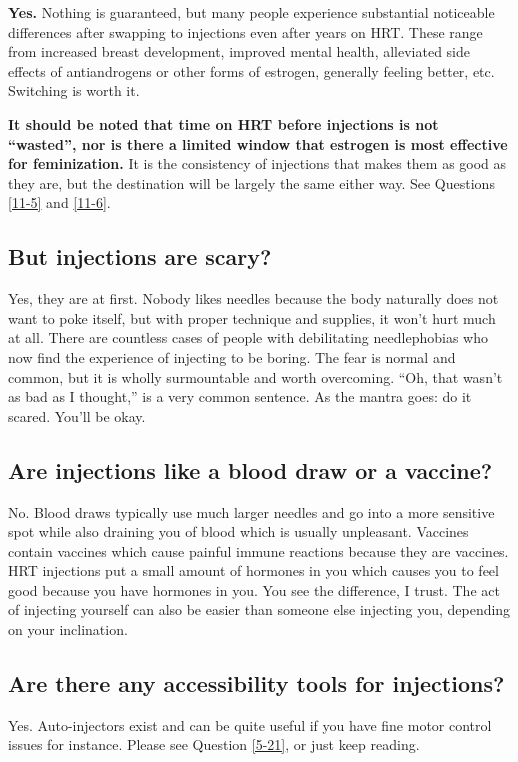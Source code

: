 \documentclass{article}
\begin{document}
\textbf{Yes.} Nothing is guaranteed, but many people experience substantial noticeable differences after swapping to injections even after years on HRT. These range from increased breast development, improved mental health, alleviated side effects of antiandrogens or other forms of estrogen, generally feeling better, etc. Switching is worth it.

\textbf{It should be noted that time on HRT before injections is not “wasted”, nor is there a limited window that estrogen is most effective for feminization.} It is the consistency of injections that makes them as good as they are, but the destination will be largely the same either way. See Questions \ref{11-5} and \ref{11-6}.

\subsection{But injections are scary?}

Yes, they are at first. Nobody likes needles because the body naturally does not want to poke itself, but with proper technique and supplies, it won’t hurt much at all. There are countless cases of people with debilitating needlephobias who now find the experience of injecting to be boring. The fear is normal and common, but it is wholly surmountable and worth overcoming. “Oh, that wasn’t as bad as I thought,” is a very common sentence. As the mantra goes: do it scared. You’ll be okay.

\subsection{Are injections like a blood draw or a vaccine?}

No. Blood draws typically use much larger needles and go into a more sensitive spot while also draining you of blood which is usually unpleasant. Vaccines contain vaccines which cause painful immune reactions because they are vaccines. HRT injections put a small amount of hormones in you which causes you to feel good because you have hormones in you. You see the difference, I trust. The act of injecting yourself can also be easier than someone else injecting you, depending on your inclination.

\subsection{Are there any accessibility tools for injections?}

Yes. Auto-injectors exist and can be quite useful if you have fine motor control issues for instance. Please see Question \ref{5-21}, or just keep reading.
\end{document}
